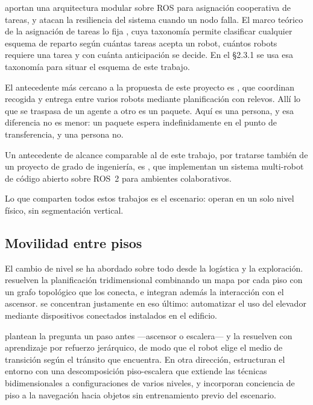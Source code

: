 \textcite{xu2025modular} aportan una arquitectura modular sobre ROS para
asignación cooperativa de tareas, y \textcite{zhan2025kubernetes} atacan la
resiliencia del sistema cuando un nodo falla. El marco teórico de la asignación
de tareas lo fija \textcite{gerkey2004taxonomy}, cuya taxonomía permite
clasificar cualquier esquema de reparto según cuántas tareas acepta un robot,
cuántos robots requiere una tarea y con cuánta anticipación se decide. En el
§2.3.1 se usa esa taxonomía para situar el esquema de este trabajo.

El antecedente más cercano a la propuesta de este proyecto es
\textcite{srivastava2025deliver}, que coordinan recogida y entrega entre varios
robots mediante planificación con relevos. Allí lo que se traspasa de un agente a
otro es un paquete. Aquí es una persona, y esa diferencia no es menor: un paquete
espera indefinidamente en el punto de transferencia, y una persona no.

Un antecedente de alcance comparable al de este trabajo, por tratarse también de
un proyecto de grado de ingeniería, es \textcite{piguave2023multirobot}, que
implementan un sistema multi-robot de código abierto sobre ROS~2 para ambientes
colaborativos.

Lo que comparten todos estos trabajos es el escenario: operan en un solo nivel
físico, sin segmentación vertical.

\subsection{Movilidad entre pisos}

El cambio de nivel se ha abordado sobre todo desde la logística y la
exploración. \textcite{kim2024indoor} resuelven la planificación tridimensional
combinando un mapa por cada piso con un grafo topológico que los conecta, e
integran además la interacción con el ascensor. \textcite{song2024elevator} se
concentran justamente en eso último: automatizar el uso del elevador mediante
dispositivos conectados instalados en el edificio.

\textcite{luo2025elevator} plantean la pregunta un paso antes —ascensor o
escalera— y la resuelven con aprendizaje por refuerzo jerárquico, de modo que el
robot elige el medio de transición según el tránsito que encuentra. En otra
dirección, \textcite{chen2025lite} estructuran el entorno con una descomposición
piso-escalera que extiende las técnicas bidimensionales a configuraciones de
varios niveles, y \textcite{gong2026stairway} incorporan conciencia de piso a la
navegación hacia objetos sin entrenamiento previo del escenario.

